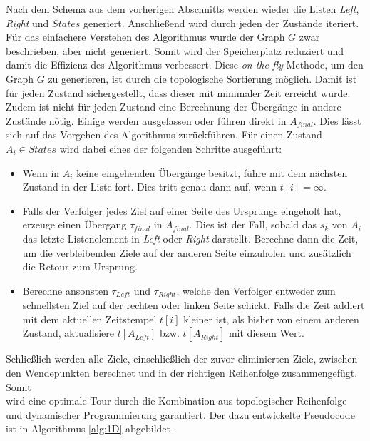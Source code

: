 \documentclass[german,version-2019-11]{uzl-thesis}
\begin{document}
Nach dem Schema aus dem vorherigen Abschnitts werden wieder die Listen \emph{Left}, \emph{Right} und $States$ generiert. Anschließend wird durch jeden der Zustände iteriert. Für das einfachere Verstehen des Algorithmus wurde der Graph $G$ zwar beschrieben, aber nicht generiert. Somit wird der Speicherplatz reduziert und damit die Effizienz des Algorithmus verbessert. Diese \emph{on-the-fly}-Methode, um den Graph $G$ zu generieren, ist durch die topologische Sortierung möglich. Damit ist für jeden Zustand sichergestellt, dass dieser mit minimaler Zeit erreicht wurde. Zudem ist nicht für jeden Zustand eine Berechnung der Übergänge in andere Zustände nötig. Einige werden ausgelassen oder führen direkt in $A_{final}$. Dies lässt sich auf das Vorgehen des Algorithmus zurückführen. Für einen Zustand $A_i\in States$ wird dabei eines der folgenden Schritte ausgeführt:
\begin{itemize}
\item Wenn in $A_i$ keine eingehenden Übergänge besitzt, führe mit dem nächsten Zustand in der Liste fort. Dies tritt genau dann auf, wenn $t[i] = \infty$.
\item Falls der Verfolger jedes Ziel auf einer Seite des Ursprungs eingeholt hat, erzeuge einen Übergang $\tau_{final}$ in $A_{final}$. Dies ist der Fall, sobald das $s_k$ von $A_i$ das letzte Listenelement in \emph{Left} oder \emph{Right} darstellt. Berechne dann die Zeit, um die verbleibenden Ziele auf der anderen Seite einzuholen und zusätzlich die Retour zum Ursprung. 
\item Berechne ansonsten $\tau_{Left}$ und $\tau_{Right}$, welche den Verfolger entweder zum schnellsten Ziel auf der rechten oder linken Seite schickt. Falls die Zeit addiert mit dem aktuellen Zeitstempel $t[i]$ kleiner ist, als bisher von einem anderen Zustand, aktualisiere $t[A_{Left}]$ bzw. $t[A_{Right}]$ mit diesem Wert.
\end{itemize}
Schließlich werden alle Ziele, einschließlich der zuvor eliminierten Ziele, zwischen den Wendepunkten berechnet und in der richtigen Reihenfolge zusammengefügt. Somit \\wird eine optimale Tour durch die Kombination aus topologischer Reihenfolge und dynamischer Programmierung garantiert. Der dazu entwickelte Pseudocode ist in Algorithmus \ref{alg:1D} abgebildet \cite{helvig}. 
\end{document}
